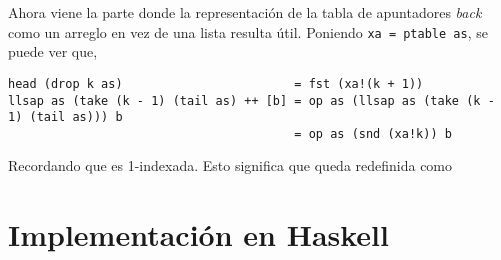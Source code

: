 Ahora viene la parte donde la representación de la tabla de apuntadores \textit{back} como un arreglo en vez de una lista
resulta útil. Poniendo \texttt{xa = ptable as}, se puede ver que,

\begin{verbatim}
head (drop k as)                        = fst (xa!(k + 1))
llsap as (take (k - 1) (tail as) ++ [b] = op as (llsap as (take (k - 1) (tail as))) b
                                        = op as (snd (xa!k)) b
\end{verbatim}

Recordando que  es 1-indexada. Esto significa que  queda redefinida como

\section{Implementación en Haskell}

\inputminted{haskell}{codigo/haskell/failure-function-optimized.hs}

